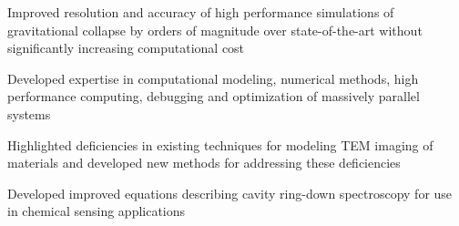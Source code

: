 
\begin{cventries}

{
  \begin{cvitems} %
    \item Improved resolution and accuracy of high performance simulations of gravitational collapse by orders of magnitude over state-of-the-art without significantly increasing computational cost
    \item Developed expertise in computational modeling, numerical methods, high performance computing, debugging and optimization of massively parallel systems
  \end{cvitems}
}

{
  \begin{cvitems}
    \item Highlighted deficiencies in existing techniques for modeling TEM imaging of materials and developed new methods for addressing these deficiencies
    \item Developed improved equations describing cavity ring-down spectroscopy for use in chemical sensing applications
  \end{cvitems}
}

\end{cventries}

